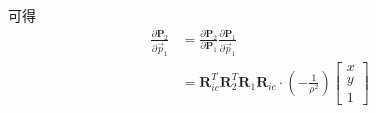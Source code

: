 \documentclass{article}
\begin{document}
可得
\begin{equation}
	\begin{aligned}
		\frac{\partial{\boldsymbol{P}_2}} {\partial{\vec{p}_1}} &=\frac{\partial{\boldsymbol{P}_2}} {\partial{\boldsymbol{P}_1}} \frac{\partial{\boldsymbol{P}_1}} {\partial{\vec{p}_1}} \\
		&= \boldsymbol{R}_{ic}^{T}\boldsymbol{R}_2^{T}\boldsymbol{R}_1\boldsymbol{R}_{ic}\cdot 
		\left(-\frac{1}{\rho^2}\right)
		\left[
		\begin{matrix}
		x\\
		y\\
		1
		\end{matrix}
		\right] 
	\end{aligned}
\end{equation}
	
\end{document}
